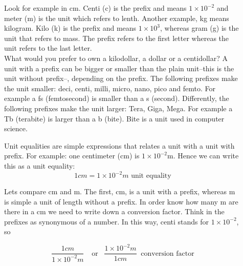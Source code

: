 \documentclass[main.tex]{subfiles}
\begin{document}
\begin{description}
\item[] Look for example in cm. Centi (c) is the prefix and means $1\times10^{-2}$ and meter (m) is the unit which refers to lenth. Another example, kg means kilogram. Kilo (k) is the prefix and means $1\times10^{3}$, whereas gram (g) is the unit that refers to mass. The prefix refers to the first letter whereas the unit refers to the last letter. \\
What would you prefer to own a kilodollar, a dollar or a centidollar? A unit with a prefix can be bigger or smaller than the plain unit--this is the unit without prefix--, depending on the prefix. The following prefixes make the unit smaller: deci, centi, milli, micro, nano, pico and femto. For example a fs (femtosecond) is smaller than a s (second). Differently, the following prefixes make the unit larger: Tera, Giga, Mega. For example a Tb (terabite) is larger than a b (bite). Bite is a unit used in computer science.
\item[] Unit equalities are simple expressions that relates a unit with a unit with prefix. For example: one centimeter (cm) is $1\times10^{-2}$m. Hence we can write this as a unit equality:
\begin{equation*}
\boxed{   1cm=1\times10^{-2}m}\text{ unit equality}    
\end{equation*}
\item[] Let\textquotesingle s compare cm and m. The first, cm, is a unit with a prefix, whereas m is simple a unit of length without a prefix. In order know how many m are there in a cm we need to write down a conversion factor. Think in the prefixes as synonymous of a number. In this way, centi stands for  $1\times10^{-2}$, so


\begin{equation*}
\boxed{   \frac{1cm}{1\times10^{-2}m}\ \enspace \text{ or  } \enspace \frac{1\times10^{-2}m}{1cm} }  \  \text{ conversion factor}   
\end{equation*}
 \end{description}
\end{document}
